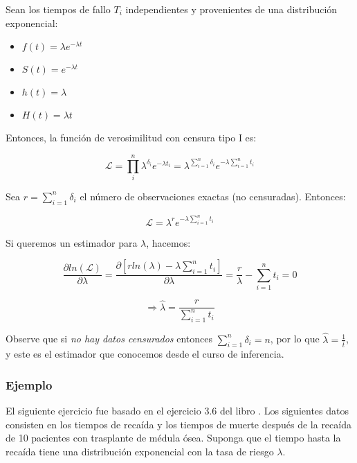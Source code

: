 \documentclass[
  a4paper,
  oneside,
  openany]{book}
\providecommand{\tightlist}{%
  \setlength{\itemsep}{0pt}\setlength{\parskip}{0pt}}
\begin{document}
Sean los tiempos de fallo \(T_{i}\) independientes y provenientes de una distribución exponencial:

\begin{itemize}
\tightlist
\item
  \(f(t) = \lambda e^{-\lambda t}\)
\item
  \(S(t) = e^{-\lambda t}\)
\item
  \(h(t) = \lambda\)
\item
  \(H(t) = \lambda t\)
\end{itemize}

Entonces, la función de verosimilitud con censura tipo I es:

\[
\mathscr{L} = \prod_{i}^{n}\lambda^{\delta_{i}}e^{-\lambda t_{i}}= \lambda^{\sum_{i= 1}^{n}\delta_{i}}e^{-\lambda \sum_{i = 1}^{n}t_{i}}
\]

Sea \(r=\sum_{i = 1}^{n}\delta_{i}\) el número de observaciones exactas (no censuradas). Entonces:

\[
 \mathscr{L} = \lambda^{r}e^{-\lambda\sum_{i= 1}^{n}t_{i}}
\]

Si queremos un estimador para \(\lambda\), hacemos:

\[
\frac{\partial ln(\mathscr{L})}{\partial \lambda} = \frac{\partial[r ln(\lambda)-\lambda\sum_{i = 1}^{n}t_{i}]}{\partial\lambda} = \frac{r}{\lambda}-\sum_{i  =1}^{n}t_i = 0
\]

\[
\Longrightarrow \hat{\lambda} = \frac{r}{\sum_{i= 1}^{n}t_{i}}
\]

Observe que si \emph{no hay datos censurados} entonces \(\sum_{i = 1}^{n}\delta_{i}=n\), por lo que \(\hat{\lambda}=\frac{1}{\bar t}\), y este es el estimador que conocemos desde el curso de inferencia.

\hypertarget{ejemplo-8}{%
\subsubsection*{Ejemplo}\label{ejemplo-8}}


El siguiente ejercicio fue basado en el ejercicio 3.6 del libro \citep{klein2006survival}. Los siguientes datos consisten en los tiempos de recaída y los tiempos de muerte después de la recaída de 10 pacientes con trasplante de médula ósea. Suponga que el tiempo hasta la recaída tiene una distribución exponencial con la tasa de riesgo \(\lambda\).
\end{document}
